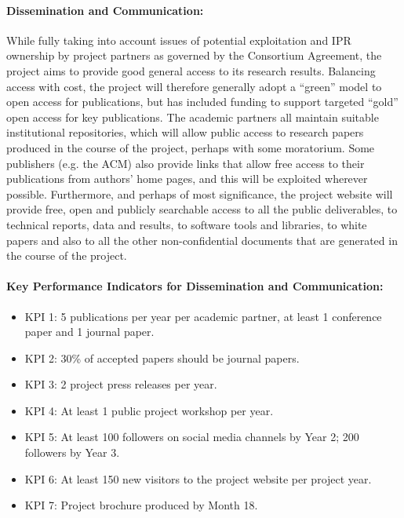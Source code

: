 \documentclass[a4paper,11pt]{article}
\begin{document}
\paragraph{Dissemination and Communication:}
While fully taking into account issues of potential exploitation and IPR ownership by project partners
as governed by the Consortium Agreement,
the project aims to provide good general access to its research results.
Balancing access with cost, the project will therefore generally adopt a ``green'' model to open access for publications,
but has included funding to support targeted ``gold'' open access for key publications.
The academic partners all maintain suitable institutional repositories, which will allow public access to research papers produced in the
course of the project, perhaps with some moratorium.  Some publishers (e.g. the ACM) also provide links that allow
free access to their publications from authors' home pages, and this will be exploited wherever possible.
%
Furthermore, and perhaps of most significance, the project website will provide free,
open and publicly searchable access to all the public deliverables, to technical reports, data and results, to software tools
and libraries, to white papers and also to all
the other non-confidential documents that are generated in the course of the project.  

\begin{mdframed}[backgroundcolor=blue!5]
\paragraph{Key Performance Indicators for Dissemination and Communication:}
\begin{itemize}
\item KPI 1: 5 publications per year per academic partner, at least 1 conference paper and 1 journal paper.
\item KPI 2: 30\% of accepted papers should be journal papers.
\item KPI 3: 2 project press releases per year.
\item KPI 4: At least 1 public project workshop per year.
\item KPI 5: At least 100 followers on social media channels by Year 2; 200 followers by Year 3.
\item KPI 6: At least 150 new visitors to the project website per project year.
\item KPI 7: Project brochure produced by Month 18.
\end{itemize}
\end{mdframed}
\end{document}

